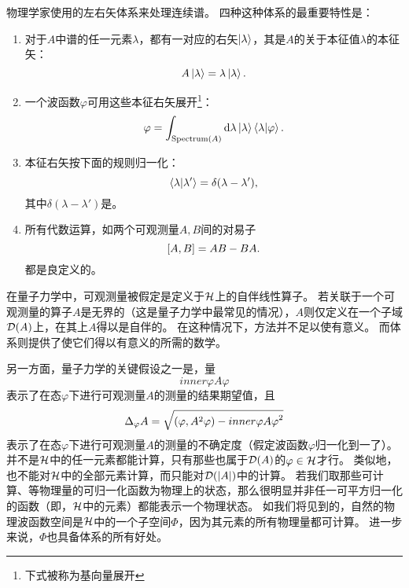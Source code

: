 物理学家使用\dirac 的左右矢体系来处理连续谱。
四种这种体系的最重要特性是：
\begin{enumerate}
	\item 对于\(A\)中谱的任一元素\(\lambda\)，都有一对应的右矢\(\ket\lambda\)，其是\(A\)的关于本征值\(\lambda\)的本征矢：
	\[\label{eq:dirac_formalism_feature_1}
		A\ket\lambda=\lambda\ket\lambda.\]
	\item 一个波函数\(\varphi\)可用这些本征右矢展开\footnote{下式被称为\dirac 基向量展开}：
	\[\label{eq:dirac_formalism_feature_2}
		\varphi=\int_{\operatorname{Spectrum}(A)}{\mathrm d}\lambda\ket\lambda\braket{\lambda|\varphi}.\]
	\item 本征右矢按下面的规则归一化：
	\[\braket{\lambda|\lambda'}=\delta(\lambda-\lambda'),\]
	其中\(\delta(\lambda-\lambda')\)是\deltafunc 。
	\item 所有代数运算，如两个可观测量\(A,B\)间的对易子
	\[\label{eq:dirac_formalism_feature_4}
		\left[A,B\right]= AB-BA.\]
	都是良定义的。
\end{enumerate}
	
在量子力学中，可观测量被假定是定义于\hs\(\mathcal H\)上的自伴线性算子。
若关联于一个可观测量的算子\(A\)是无界的（这是量子力学中最常见的情况），\(A\)则仅定义在一个子域\(\mathcal D(A)\)上，在其上\(A\)得以是自伴的。
在这种情况下，\hs 方法并不足以使有意义。
而\RHS 体系则提供了使它们得以有意义的所需的数学。

另一方面，量子力学的关键假设之一是，量
\[\label{eq:expectation}
	inner{\varphi}{A\varphi}\]
表示了在态\(\varphi\)下进行可观测量\(A\)的测量的结果期望值，且
\[\label{eq:variance}
	\Delta_\varphi A=\sqrt{\left(\varphi,A^2\varphi\right)-inner{\varphi}{A\varphi}^2}\]
表示了在态\(\varphi\)下进行可观测量\(A\)的测量的不确定度（假定波函数\(\varphi\)归一化到一了）。
并不是\hs\(\mathcal H\)中的任一元素都能计算，只有那些也属于\(\mathcal D(A)\)的\(\varphi\in\mathcal H\)才行。
类似地，也不能对\hs\(\mathcal H\)中的全部元素计算，而只能对\(\mathcal D(|A|)\)中的计算。%
若我们取那些可计算、等物理量的可归一化函数为物理上的状态，那么很明显并非任一可平方归一化的函数（即，\(\mathcal H\)中的元素）都能表示一个物理状态。
如我们将见到的，自然的物理波函数空间是\(\mathcal H\)中的一个子空间\(\Phi\)，因为其元素的所有物理量都可计算。
进一步来说，\(\Phi\)也具备\dirac 体系的所有好处。

